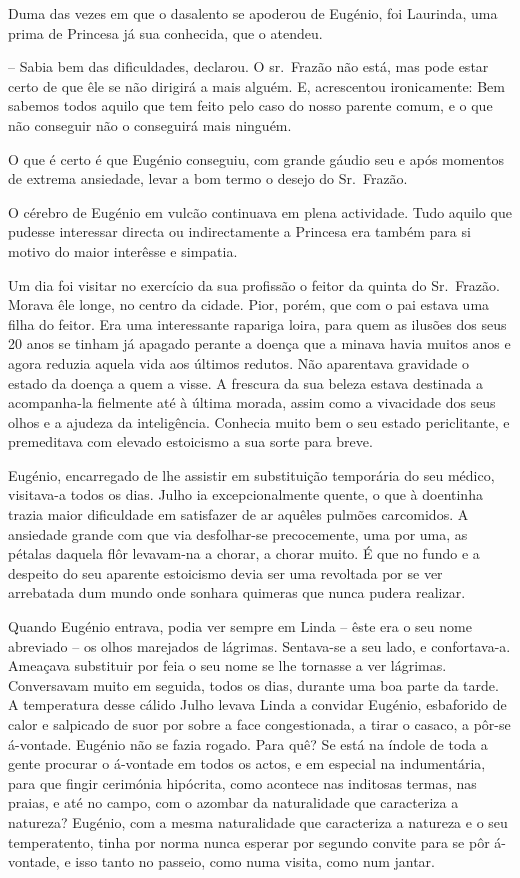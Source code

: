 \documentclass[9pt]{article}
\begin{document}
Duma das vezes em que o dasalento se apoderou de Eugé\-nio, foi Laurinda,
uma prima de Princesa já sua conhecida, que o atendeu.

-- Sabia bem das dificuldades, declarou. O sr.\ Frazão não está,
mas pode estar certo de que êle se não dirigirá a mais alguém. E,
acrescentou ironicamente: Bem sabemos todos aquilo que tem feito
pelo caso do nosso parente comum, e o que não conseguir não o conseguirá mais nin\-guém.

O que é certo é que Eugé\-nio conseguiu, com gran\-de gáudio seu e
após momentos de extrema ansiedade, levar a bom termo o desejo do Sr.\
Frazão.

O cérebro de Eugé\-nio em vulcão continuava em plena actividade.
Tudo aquilo que pudesse interessar directa ou indirectamente a Princesa era também para si motivo do maior interêsse e simpatia.

Um dia foi visitar no exercício da sua profissão o feitor da quinta do Sr.\ Frazão. Morava êle longe, no centro da cidade. Pior, porém, que com o
pai estava uma fi\-lha do feitor. Era uma interessante rapariga loira,
para quem as ilusões dos seus 20 anos se tinham já apagado perante
a doença que a minava havia muitos anos e agora reduzia aquela vida
aos últimos redutos. Não aparentava gravidade o estado da doença a
quem a visse. A frescura da sua beleza estava destinada a acompanha-la fielmente até à última morada, assim como a vivacidade dos seus
o\-lhos e a ajudeza da inteligência. Conhecia muito bem o seu estado periclitante, e premeditava com elevado estoicismo a sua sorte para breve.

Eugé\-nio, encarregado de lhe assistir em substitui\-ção temporária
do seu médico, visitava-a todos os dias. Ju\-lho ia excepcionalmente
quente, o que à doentinha trazia maior dificuldade em satisfazer de
ar a\-quê\-les pulmões carcomidos. A ansiedade gran\-de com que via desfo\-\mbox{lhar-se} precocemente, uma por uma, as pétalas daquela flôr levavam-na a chorar, a chorar muito. É que no fundo e a despeito do seu aparente estoicismo devia ser uma revoltada por se ver arrebatada dum mundo onde
sonhara quimeras que nunca pudera realizar.

Quando Eugé\-nio entrava, podia ver sempre em Linda -- êste era o
seu nome abreviado -- os o\-lhos marejados de lágrimas. Sentava-se a
seu lado, e confortava-a. Ameaçava substituir por feia o seu nome se
\-lhe tornasse a ver lágrimas. Conversavam muito em seguida, todos os
dias, durante uma boa parte da tarde. A temperatura desse cálido Ju\-lho levava Linda a convidar Eugé\-nio, esbaforido de calor e salpicado de suor por
sobre a face congestionada, a tirar o casaco, a pôr-se \mbox{á-vontade}. Eugé\-nio não
se fazia rogado. Para quê? Se está na índole de toda a gente procurar o
á-vontade em todos os actos, e em especial na indumentária, para que fingir
cerimónia hipócrita, como acontece nas inditosas termas, nas praias, e até no
campo, com o azombar da naturalidade que ca\-ra\-cte\-ri\-za a natureza? Eugénio, com a mesma naturalidade que ca\-ra\-cte\-ri\-za a natureza e o seu temperatento, tinha por norma nunca esperar por segundo convite para se pôr á-vontade, e isso tanto no passeio, como numa visita, como num jantar.
\end{document}
